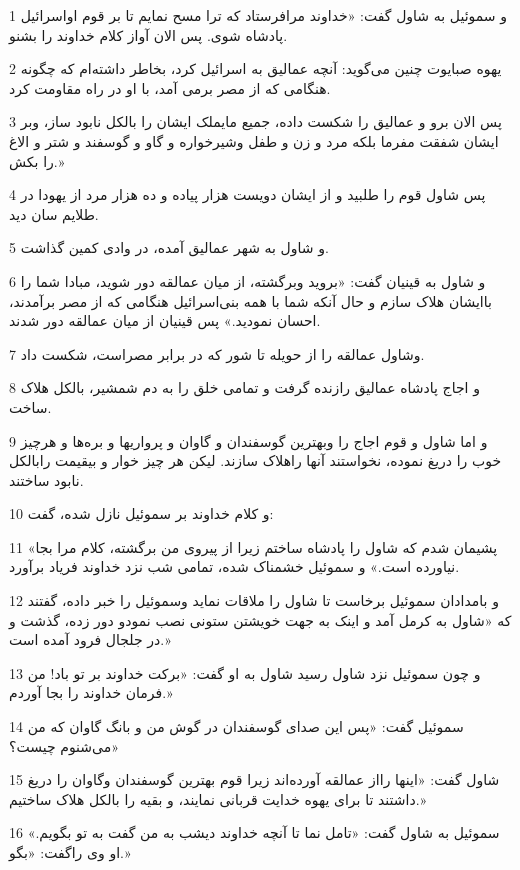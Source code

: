 \par 1 و سموئیل به شاول گفت: «خداوند مرافرستاد که ترا مسح نمایم تا بر قوم اواسرائیل پادشاه شوی. پس الان آواز کلام خداوند را بشنو.
\par 2 یهوه صبایوت چنین می‌گوید: آنچه عمالیق به اسرائیل کرد، بخاطر داشته‌ام که چگونه هنگامی که از مصر برمی آمد، با او در راه مقاومت کرد.
\par 3 پس الان برو و عمالیق را شکست داده، جمیع مایملک ایشان را بالکل نابود ساز، وبر ایشان شفقت مفرما بلکه مرد و زن و طفل وشیرخواره و گاو و گوسفند و شتر و الاغ را بکش.»
\par 4 پس شاول قوم را طلبید و از ایشان دویست هزار پیاده و ده هزار مرد از یهودا در طلایم سان دید.
\par 5 و شاول به شهر عمالیق آمده، در وادی کمین گذاشت.
\par 6 و شاول به قینیان گفت: «بروید وبرگشته، از میان عمالقه دور شوید، مبادا شما را باایشان هلاک سازم و حال آنکه شما با همه بنی‌اسرائیل هنگامی که از مصر برآمدند، احسان نمودید.» پس قینیان از میان عمالقه دور شدند.
\par 7 وشاول عمالقه را از حویله تا شور که در برابر مصراست، شکست داد.
\par 8 و اجاج پادشاه عمالیق رازنده گرفت و تمامی خلق را به دم شمشیر، بالکل هلاک ساخت.
\par 9 و اما شاول و قوم اجاج را وبهترین گوسفندان و گاوان و پرواریها و بره‌ها و هرچیز خوب را دریغ نموده، نخواستند آنها راهلاک سازند. لیکن هر چیز خوار و بیقیمت رابالکل نابود ساختند.
\par 10 و کلام خداوند بر سموئیل نازل شده، گفت:
\par 11 «پشیمان شدم که شاول را پادشاه ساختم زیرا از پیروی من برگشته، کلام مرا بجا نیاورده است.» و سموئیل خشمناک شده، تمامی شب نزد خداوند فریاد برآورد.
\par 12 و بامدادان سموئیل برخاست تا شاول را ملاقات نماید وسموئیل را خبر داده، گفتند که «شاول به کرمل آمد و اینک به جهت خویشتن ستونی نصب نمودو دور زده، گذشت و در جلجال فرود آمده است.»
\par 13 و چون سموئیل نزد شاول رسید شاول به او گفت: «برکت خداوند بر تو باد! من فرمان خداوند را بجا آوردم.»
\par 14 سموئیل گفت: «پس این صدای گوسفندان در گوش من و بانگ گاوان که من می‌شنوم چیست؟»
\par 15 شاول گفت: «اینها رااز عمالقه آورده‌اند زیرا قوم بهترین گوسفندان وگاوان را دریغ داشتند تا برای یهوه خدایت قربانی نمایند، و بقیه را بالکل هلاک ساختیم.»
\par 16 سموئیل به شاول گفت: «تامل نما تا آنچه خداوند دیشب به من گفت به تو بگویم.» او وی راگفت: «بگو.»
